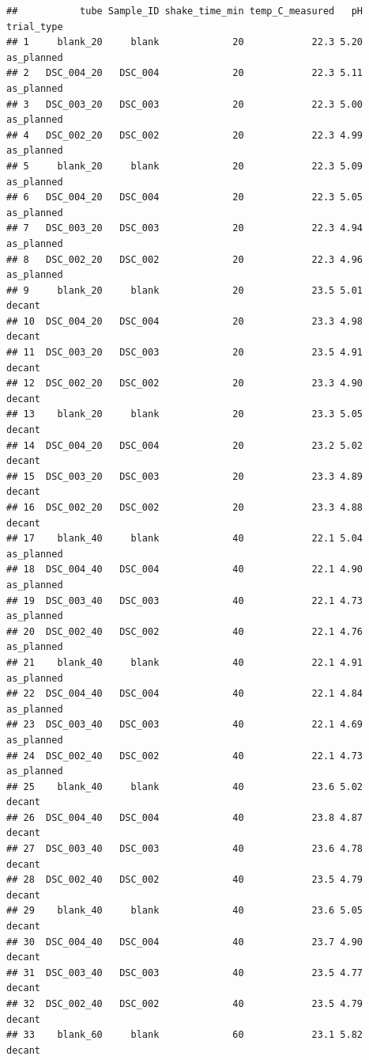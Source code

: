 \documentclass[
]{article}
\begin{document}
\begin{verbatim}
##           tube Sample_ID shake_time_min temp_C_measured   pH trial_type
## 1     blank_20     blank             20            22.3 5.20 as_planned
## 2   DSC_004_20   DSC_004             20            22.3 5.11 as_planned
## 3   DSC_003_20   DSC_003             20            22.3 5.00 as_planned
## 4   DSC_002_20   DSC_002             20            22.3 4.99 as_planned
## 5     blank_20     blank             20            22.3 5.09 as_planned
## 6   DSC_004_20   DSC_004             20            22.3 5.05 as_planned
## 7   DSC_003_20   DSC_003             20            22.3 4.94 as_planned
## 8   DSC_002_20   DSC_002             20            22.3 4.96 as_planned
## 9     blank_20     blank             20            23.5 5.01     decant
## 10  DSC_004_20   DSC_004             20            23.3 4.98     decant
## 11  DSC_003_20   DSC_003             20            23.5 4.91     decant
## 12  DSC_002_20   DSC_002             20            23.3 4.90     decant
## 13    blank_20     blank             20            23.3 5.05     decant
## 14  DSC_004_20   DSC_004             20            23.2 5.02     decant
## 15  DSC_003_20   DSC_003             20            23.3 4.89     decant
## 16  DSC_002_20   DSC_002             20            23.3 4.88     decant
## 17    blank_40     blank             40            22.1 5.04 as_planned
## 18  DSC_004_40   DSC_004             40            22.1 4.90 as_planned
## 19  DSC_003_40   DSC_003             40            22.1 4.73 as_planned
## 20  DSC_002_40   DSC_002             40            22.1 4.76 as_planned
## 21    blank_40     blank             40            22.1 4.91 as_planned
## 22  DSC_004_40   DSC_004             40            22.1 4.84 as_planned
## 23  DSC_003_40   DSC_003             40            22.1 4.69 as_planned
## 24  DSC_002_40   DSC_002             40            22.1 4.73 as_planned
## 25    blank_40     blank             40            23.6 5.02     decant
## 26  DSC_004_40   DSC_004             40            23.8 4.87     decant
## 27  DSC_003_40   DSC_003             40            23.6 4.78     decant
## 28  DSC_002_40   DSC_002             40            23.5 4.79     decant
## 29    blank_40     blank             40            23.6 5.05     decant
## 30  DSC_004_40   DSC_004             40            23.7 4.90     decant
## 31  DSC_003_40   DSC_003             40            23.5 4.77     decant
## 32  DSC_002_40   DSC_002             40            23.5 4.79     decant
## 33    blank_60     blank             60            23.1 5.82     decant

\end{verbatim}
\end{document}
